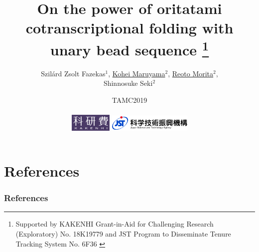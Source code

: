 \documentclass[11pt]{beamer}
\title{On the power of oritatami cotranscriptional folding with unary bead sequence
\footnote[0]{
{ \tiny
	Supported by KAKENHI Grant-in-Aid for Challenging Research (Exploratory) No. 18K19779
and JST Program to Disseminate Tenure Tracking System No. 6F36
}
}}
\date{TAMC2019 \\ \  \\
\includegraphics[width=0.15\textwidth]{fig/whiteKAKENHIlogoM_jp.jpg}
\includegraphics[width=0.3\textwidth]{fig/jstlogo_sample.png}
}
\author{Szil\'{a}rd Zsolt Fazekas${}^1$, \underline{Kohei Maruyama${}^2$}, \underline{Reoto Morita${}^2$}, \\Shinnosuke Seki${}^2$}
\institute{${}^1$Akita University, ${}^2$University of Electro-Communications}
\begin{document}
\begin{frame}\frametitle{}
 \titlepage
\end{frame}









\section{References}
\begin{frame}[t, allowframebreaks]\frametitle{References}

\end{frame}
\end{document}
